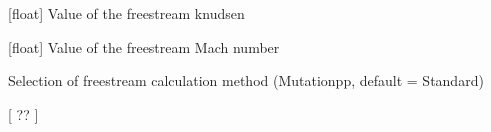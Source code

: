 \documentclass[letterpaper,10pt,english]{sphinxmanual}
\begin{document}
\begin{fulllineitems}
\begin{fulllineitems}
\end{fulllineitems}


\begin{fulllineitems}
\label{\detokenize{modules:configuration.Freestream.knudsen}}
\pysigstartsignatures
{}
\pysigstopsignatures
\sphinxAtStartPar
{[}float{]} Value of the freestream knudsen

\end{fulllineitems}


\begin{fulllineitems}
\label{\detokenize{modules:configuration.Freestream.mach}}
\pysigstartsignatures
{}
\pysigstopsignatures
\sphinxAtStartPar
{[}float{]} Value of the freestream Mach number

\end{fulllineitems}


\begin{fulllineitems}
\label{\detokenize{modules:configuration.Freestream.method}}
\pysigstartsignatures
{}
\pysigstopsignatures
\sphinxAtStartPar
Selection of freestream calculation method (Mutationpp, default = Standard)

\end{fulllineitems}


\begin{fulllineitems}
\label{\detokenize{modules:configuration.Freestream.mfp}}
\pysigstartsignatures
{}
\pysigstopsignatures
\sphinxAtStartPar
{[} ?? {]}

\end{fulllineitems}



\end{fulllineitems}
\end{document}
